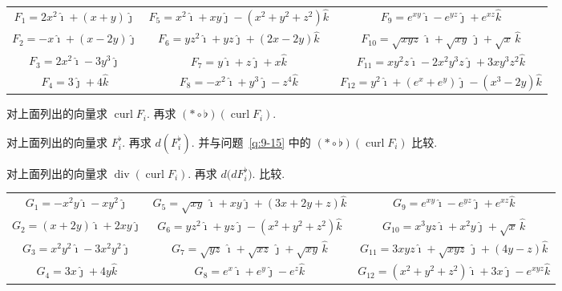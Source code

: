 \begin{center}
{\setlength{\tabcolsep}{4pt}\small\begin{tabular}{ccc}
$F_1=2x^2\hat{\imath}+(x+y)\hat{\jmath}$ & $F_5=x^2\hat{\imath}+xy\hat{\jmath}-(x^2+y^2+z^2)\hat{k}$ & $F_9=e^{xy}\hat{\imath}-e^{yz}\hat{\jmath}+e^{xz}\hat{k}$\\[3pt]
$F_2=-x\hat{\imath}+(x-2y)\hat{\jmath}$ & $F_6=yz^2\hat{\imath}+yz\hat{\jmath}+(2x-2y)\hat{k}$ & $F_{10}=\sqrt{xyz}\,\hat{\imath}+\sqrt{xy}\,\hat{\jmath}+\sqrt{x}\,\hat{k}$\\[3pt]
$F_3=2x^2\hat{\imath}-3y^3\hat{\jmath}$ & $F_7=y\hat{\imath}+z\hat{\jmath}+x\hat{k}$ & $F_{11}=xy^2z\hat{\imath}-2x^2y^3z\hat{\jmath}+3xy^3z^2\hat{k}$\\[3pt]
$F_4=3\hat{\jmath}+4\hat{k}$ & $F_8=-x^2\hat{\imath}+y^3\hat{\jmath}-z^4\hat{k}$ & $F_{12}=y^2\hat{\imath}+(e^x+e^y)\hat{\jmath}-(x^3-2y)\hat{k}$
\end{tabular}}
\end{center}

\begin{question}\label{q:9-15}
对上面列出的向量求 $\operatorname{curl}F_i$. 再求 $(\ast\circ\flat)(\operatorname{curl}F_i)$.
\end{question}

\begin{question}\label{q:9-16}
对上面列出的向量求 $F_i^{\flat}$. 再求 $d(F_i^{\flat})$. 并与问题~\ref{q:9-15} 中的 $(\ast\circ\flat)(\operatorname{curl}F_i)$ 比较.
\end{question}

\begin{question}\label{q:9-17}
对上面列出的向量求 $\operatorname{div}(\operatorname{curl}F_i)$. 再求 $d\bigl(dF_i^{\flat}\bigr)$. 比较.
\end{question}

\begin{center}
{\setlength{\tabcolsep}{3pt}\footnotesize\begin{tabular}{ccc}
$G_1=-x^2y\hat{\imath}-xy^2\hat{\jmath}$ & $G_5=\sqrt{xy}\,\hat{\imath}+xy\hat{\jmath}+(3x+2y+z)\hat{k}$ & $G_9=e^{xy}\hat{\imath}-e^{yz}\hat{\jmath}+e^{xz}\hat{k}$\\[3pt]
$G_2=(x+2y)\hat{\imath}+2xy\hat{\jmath}$ & $G_6=yz^2\hat{\imath}+yz\hat{\jmath}-(x^2+y^2+z^2)\hat{k}$ & $G_{10}=x^3yz\hat{\imath}+x^2y\hat{\jmath}+\sqrt{x}\,\hat{k}$\\[3pt]
$G_3=x^2y^2\hat{\imath}-3x^2y^2\hat{\jmath}$ & $G_7=\sqrt{yz}\,\hat{\imath}+\sqrt{xz}\,\hat{\jmath}+\sqrt{xy}\,\hat{k}$ & $G_{11}=3xyz\hat{\imath}+\sqrt{xyz}\,\hat{\jmath}+(4y-z)\hat{k}$\\[3pt]
$G_4=3x\hat{\jmath}+4y\hat{k}$ & $G_8=e^x\hat{\imath}+e^y\hat{\jmath}-e^z\hat{k}$ & $G_{12}=(x^2+y^2+z^2)\hat{\imath}+3x\hat{\jmath}-e^{xyz}\hat{k}$
\end{tabular}}
\end{center}

